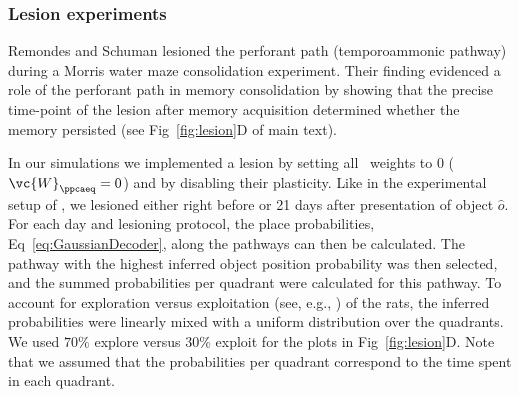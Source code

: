 \subsubsection{Lesion experiments}
Remondes and Schuman \cite{Remondes2004} lesioned the perforant path (temporoammonic pathway) during a Morris water maze consolidation experiment. Their finding evidenced a role of the perforant path in memory consolidation by showing that the precise time-point of the lesion after memory acquisition determined whether the memory persisted (see Fig~\ref{fig:lesion}D of main text).

In our simulations we implemented a lesion by setting all \ppca~weights to $0$ ($\vc{W}_{\ppcaeq} = 0$) and by disabling their plasticity. Like in the experimental setup of \cite{Remondes2004}, we lesioned either right before or 21 days after presentation of object $\hat o$. For each day and lesioning protocol, the place probabilities, Eq~\eqref{eq:GaussianDecoder}, along the pathways can then be calculated. The pathway with the highest inferred object position probability was then selected, and the summed probabilities per quadrant were calculated for this pathway. To account for exploration versus exploitation (see, e.g., \cite{Sutton1998}) of the rats, the inferred probabilities were linearly mixed with a uniform distribution over the quadrants. We used $70\%$ explore versus $30\%$ exploit for the plots in Fig~\ref{fig:lesion}D. Note that we assumed that the probabilities per quadrant correspond to the time spent in each quadrant.




